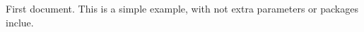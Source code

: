 \documentclass{article}
\begin{document}
First document. This is a simple example, with not extra parameters or packages
inclue. 
\end{document}
